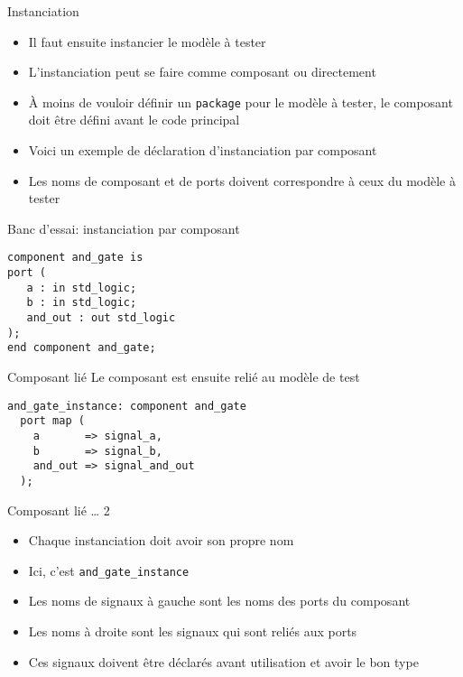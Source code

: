 \documentclass[presentation]{beamer}
\begin{document}
\begin{frame}[label={sec:org9d60738},fragile]{Instanciation}
 \begin{itemize}
\item Il faut ensuite instancier le modèle à tester
\item L'instanciation peut se faire comme composant ou directement
\item À moins de vouloir définir un \texttt{package} pour le modèle à tester, le composant doit être défini \alert{avant} le code principal
\item Voici un exemple de déclaration d'instanciation par composant
\item Les noms de composant et de ports doivent correspondre à ceux du modèle à tester
\end{itemize}
\end{frame}

\begin{frame}[label={sec:orga31c7e4},fragile]{Banc d'essai: instanciation par composant}
 \begin{verbatim}
component and_gate is 
port ( 
   a : in std_logic; 
   b : in std_logic; 
   and_out : out std_logic 
); 
end component and_gate; 
\end{verbatim}
\end{frame}


\begin{frame}[label={sec:org8062334},fragile]{Composant lié}
 Le composant est ensuite relié au modèle de test

\begin{verbatim}
and_gate_instance: component and_gate
  port map (
    a       => signal_a,
    b       => signal_b,
    and_out => signal_and_out
  );
\end{verbatim}
\end{frame}

\begin{frame}[label={sec:org6d24d31},fragile]{Composant lié \ldots{} 2}
 \begin{itemize}
\item Chaque instanciation doit avoir son propre nom
\item Ici, c'est \texttt{and\_gate\_instance}
\item Les noms de signaux à gauche sont les noms des ports du composant
\item Les noms à droite sont les signaux qui sont reliés aux ports
\item Ces signaux doivent être déclarés avant utilisation et avoir le bon type
\end{itemize}
\end{frame}
\end{document}
